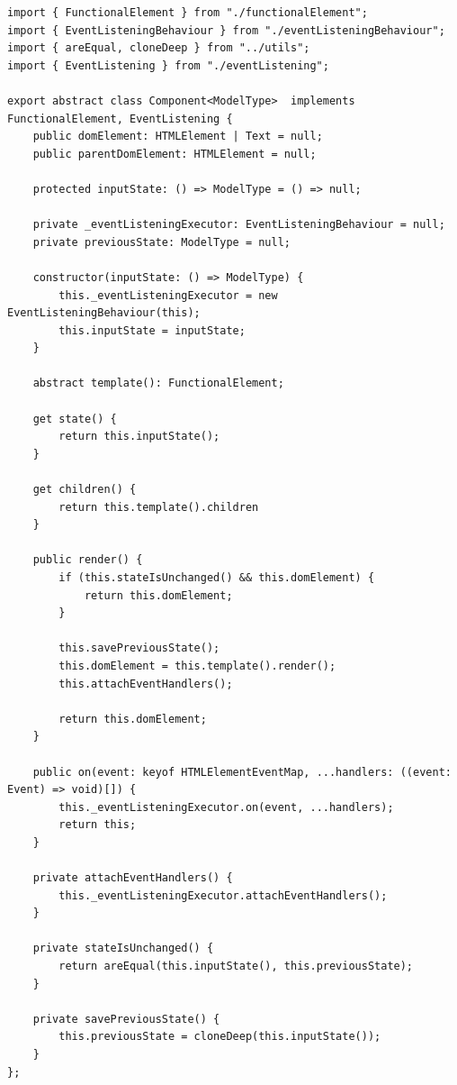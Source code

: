 \documentclass[12pt,oneside]{memoir}
\newcommand{\code}[1]{\colorbox{codegray}{\texttt{\scalebox{0.9}{#1}}}}%
\begin{document}
\begin{lstlisting}[style=jsStyle, escapeinside=\#\#, caption={Fajl \code{core/component.ts}},label=file:core:component.ts]
import { FunctionalElement } from "./functionalElement";
import { EventListeningBehaviour } from "./eventListeningBehaviour";
import { areEqual, cloneDeep } from "../utils";
import { EventListening } from "./eventListening";

export abstract class Component<ModelType>  implements FunctionalElement, EventListening {
    public domElement: HTMLElement | Text = null;
    public parentDomElement: HTMLElement = null;

    protected inputState: () => ModelType = () => null;

    private _eventListeningExecutor: EventListeningBehaviour = null;
    private previousState: ModelType = null;

    constructor(inputState: () => ModelType) {
        this._eventListeningExecutor = new EventListeningBehaviour(this);
        this.inputState = inputState;
    }

    abstract template(): FunctionalElement;

    get state() {
        return this.inputState();
    }

    get children() {
        return this.template().children
    }

    public render() {
        if (this.stateIsUnchanged() && this.domElement) {
            return this.domElement;
        }

        this.savePreviousState();
        this.domElement = this.template().render();
        this.attachEventHandlers();

        return this.domElement;
    }

    public on(event: keyof HTMLElementEventMap, ...handlers: ((event: Event) => void)[]) {
        this._eventListeningExecutor.on(event, ...handlers);
        return this;
    }

    private attachEventHandlers() {
        this._eventListeningExecutor.attachEventHandlers();
    }
    
    private stateIsUnchanged() {
        return areEqual(this.inputState(), this.previousState);
    }

    private savePreviousState() {
        this.previousState = cloneDeep(this.inputState());
    }
};

\end{lstlisting}
\end{document}
